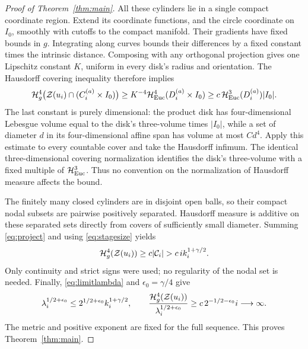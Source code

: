\begin{proof}[Proof of Theorem~\ref{thm:main}]
All these cylinders lie in a single compact coordinate region.
Extend its coordinate functions, and the circle coordinate on
\(I_0\), smoothly with cutoffs to the compact manifold.
Their gradients have fixed bounds in \(g\). Integrating along
curves bounds their differences by a fixed constant times
the intrinsic distance. Composing with any orthogonal projection
gives one Lipschitz constant \(K\), uniform in every disk's
radius and orientation.
The Hausdorff covering inequality therefore implies
\begin{equation}\label{eq:project}
 \mathcal H_g^4\bigl(\mathcal Z(u_i)\cap(C_i^{(a)}\times I_0)\bigr)
 \ge K^{-4}\mathcal H_{\mathrm{Euc}}^4(D_i^{(a)}\times I_0)
 \ge c\,\mathcal H_{\mathrm{Euc}}^3(D_i^{(a)})|I_0|.
\end{equation}
The last constant is purely dimensional: the product disk has
four-dimensional Lebesgue volume equal to the disk's
three-volume times \(|I_0|\), while a set of diameter \(d\)
in its four-dimensional affine span has volume at most \(Cd^4\).
Apply this estimate to every countable cover and take the
Hausdorff infimum. The identical three-dimensional covering
normalization identifies the disk's three-volume with a fixed
multiple of \(\mathcal H^3_{\mathrm{Euc}}\).
Thus no convention on the normalization of Hausdorff measure
affects the bound.

The finitely many closed cylinders are in disjoint open balls,
so their compact nodal subsets are pairwise positively separated.
Hausdorff measure is additive on these separated sets directly
from covers of sufficiently small diameter. Summing
\eqref{eq:project} and using \eqref{eq:stagesize} yields
\begin{equation}\label{eq:finalmeasure}
 \mathcal H_g^4(\mathcal Z(u_i))\ge c|\mathcal C_i|
                   >c\,i k_i^{1+\gamma/2}.
\end{equation}
Only continuity and strict signs were used; no regularity of
the nodal set is needed.
Finally, \eqref{eq:limitlambda} and \(\epsilon_0=\gamma/4\) give
\[
 \lambda_i^{1/2+\epsilon_0}
 \le 2^{1/2+\epsilon_0}k_i^{1+\gamma/2},\qquad
 \frac{\mathcal H_g^4(\mathcal Z(u_i))}{\lambda_i^{1/2+\epsilon_0}}
       \ge c\,2^{-1/2-\epsilon_0}i\longrightarrow\infty .
\]
The metric and positive exponent are fixed for the full sequence.
This proves Theorem~\ref{thm:main}.
\end{proof}
